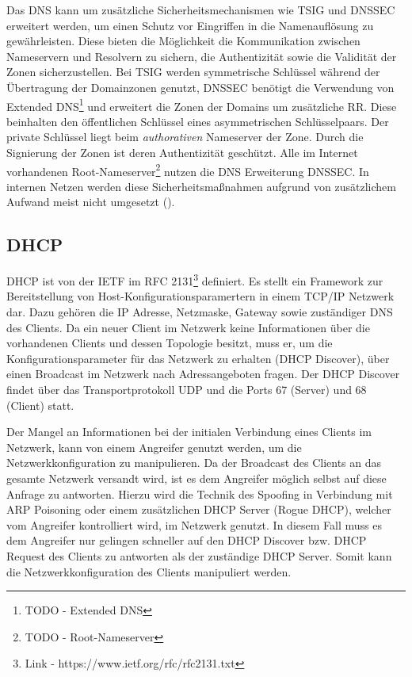 Das \ac{DNS} kann um zusätzliche Sicherheitsmechanismen wie \ac{TSIG} und \ac{DNSSEC} erweitert werden, um einen Schutz vor Eingriffen in die Namenauflösung zu gewährleisten. Diese bieten die Möglichkeit die Kommunikation zwischen Nameservern und Resolvern zu sichern, die Authentizität sowie die Validität der Zonen sicherzustellen. Bei \ac{TSIG} werden symmetrische Schlüssel während der Übertragung der Domainzonen genutzt, \ac{DNSSEC} benötigt die Verwendung von Extended \ac{DNS}\footnote{TODO - Extended DNS} und erweitert die Zonen der Domains um zusätzliche \ac{RR}. Diese beinhalten den öffentlichen Schlüssel eines asymmetrischen Schlüsselpaars. Der private Schlüssel liegt beim \textit{authorativen} Nameserver der Zone. Durch die Signierung der Zonen ist deren Authentizität geschützt. Alle im Internet vorhandenen Root-Nameserver\footnote{TODO - Root-Nameserver} nutzen die \ac{DNS} Erweiterung \ac{DNSSEC}. In internen Netzen werden diese Sicherheitsmaßnahmen aufgrund von zusätzlichem Aufwand meist nicht umgesetzt (\cite{Ledermueller2009}).

\subsection{\ac{DHCP}}
\label{Analyse:DHCP}
\ac{DHCP} ist von der \ac{IETF} im \ac{RFC} 2131\footnote{Link - https://www.ietf.org/rfc/rfc2131.txt} definiert. Es stellt ein Framework zur Bereitstellung von Host-Konfigurationsparamertern in einem \ac{TCP}/\ac{IP} Netzwerk dar. Dazu gehören die \ac{IP} Adresse, Netzmaske, Gateway sowie zuständiger \ac{DNS} des Clients. Da ein neuer Client im Netzwerk keine Informationen über die vorhandenen Clients und dessen Topologie besitzt, muss er, um die Konfigurationsparameter für das Netzwerk zu erhalten (\ac{DHCP} Discover), über einen Broadcast im Netzwerk nach Adressangeboten fragen. Der \ac{DHCP} Discover findet über das Transportprotokoll \ac{UDP} und die Ports 67 (Server) und 68 (Client) statt.

Der Mangel an Informationen bei der initialen Verbindung eines Clients im Netzwerk, kann von einem Angreifer genutzt werden, um die Netzwerkkonfiguration zu manipulieren. Da der Broadcast des Clients an das gesamte Netzwerk versandt wird, ist es dem Angreifer möglich selbst auf diese Anfrage zu antworten. Hierzu wird die Technik des Spoofing in Verbindung mit \ac{ARP} Poisoning oder einem zusätzlichen \ac{DHCP} Server (Rogue \ac{DHCP}), welcher vom Angreifer kontrolliert wird, im Netzwerk genutzt. In diesem Fall muss es dem Angreifer nur gelingen schneller auf den \ac{DHCP} Discover bzw. \ac{DHCP} Request des Clients zu antworten als der zuständige \ac{DHCP} Server. Somit kann die Netzwerkkonfiguration des Clients manipuliert werden.


